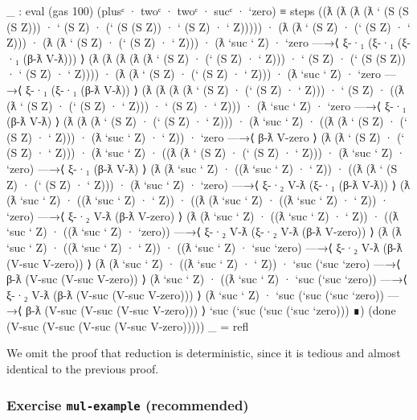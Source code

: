 \begin{fence}
\begin{code}
_ : eval (gas 100) (plusᶜ · twoᶜ · twoᶜ · sucᶜ · `zero) ≡
  steps
   ((ƛ
     (ƛ
      (ƛ (ƛ ` (S (S (S Z))) · ` (S Z) · (` (S (S Z)) · ` (S Z) · ` Z)))))
    · (ƛ (ƛ ` (S Z) · (` (S Z) · ` Z)))
    · (ƛ (ƛ ` (S Z) · (` (S Z) · ` Z)))
    · (ƛ `suc ` Z)
    · `zero
   —→⟨ ξ-·₁ (ξ-·₁ (ξ-·₁ (β-ƛ V-ƛ))) ⟩
    (ƛ
     (ƛ
      (ƛ
       (ƛ (ƛ ` (S Z) · (` (S Z) · ` Z))) · ` (S Z) ·
       (` (S (S Z)) · ` (S Z) · ` Z))))
    · (ƛ (ƛ ` (S Z) · (` (S Z) · ` Z)))
    · (ƛ `suc ` Z)
    · `zero
   —→⟨ ξ-·₁ (ξ-·₁ (β-ƛ V-ƛ)) ⟩
    (ƛ
     (ƛ
      (ƛ (ƛ ` (S Z) · (` (S Z) · ` Z))) · ` (S Z) ·
      ((ƛ (ƛ ` (S Z) · (` (S Z) · ` Z))) · ` (S Z) · ` Z)))
    · (ƛ `suc ` Z)
    · `zero
   —→⟨ ξ-·₁ (β-ƛ V-ƛ) ⟩
    (ƛ
     (ƛ (ƛ ` (S Z) · (` (S Z) · ` Z))) · (ƛ `suc ` Z) ·
     ((ƛ (ƛ ` (S Z) · (` (S Z) · ` Z))) · (ƛ `suc ` Z) · ` Z))
    · `zero
   —→⟨ β-ƛ V-zero ⟩
    (ƛ (ƛ ` (S Z) · (` (S Z) · ` Z))) · (ƛ `suc ` Z) ·
    ((ƛ (ƛ ` (S Z) · (` (S Z) · ` Z))) · (ƛ `suc ` Z) · `zero)
   —→⟨ ξ-·₁ (β-ƛ V-ƛ) ⟩
    (ƛ (ƛ `suc ` Z) · ((ƛ `suc ` Z) · ` Z)) ·
    ((ƛ (ƛ ` (S Z) · (` (S Z) · ` Z))) · (ƛ `suc ` Z) · `zero)
   —→⟨ ξ-·₂ V-ƛ (ξ-·₁ (β-ƛ V-ƛ)) ⟩
    (ƛ (ƛ `suc ` Z) · ((ƛ `suc ` Z) · ` Z)) ·
    ((ƛ (ƛ `suc ` Z) · ((ƛ `suc ` Z) · ` Z)) · `zero)
   —→⟨ ξ-·₂ V-ƛ (β-ƛ V-zero) ⟩
    (ƛ (ƛ `suc ` Z) · ((ƛ `suc ` Z) · ` Z)) ·
    ((ƛ `suc ` Z) · ((ƛ `suc ` Z) · `zero))
   —→⟨ ξ-·₂ V-ƛ (ξ-·₂ V-ƛ (β-ƛ V-zero)) ⟩
    (ƛ (ƛ `suc ` Z) · ((ƛ `suc ` Z) · ` Z)) ·
    ((ƛ `suc ` Z) · `suc `zero)
   —→⟨ ξ-·₂ V-ƛ (β-ƛ (V-suc V-zero)) ⟩
    (ƛ (ƛ `suc ` Z) · ((ƛ `suc ` Z) · ` Z)) · `suc (`suc `zero)
   —→⟨ β-ƛ (V-suc (V-suc V-zero)) ⟩
    (ƛ `suc ` Z) · ((ƛ `suc ` Z) · `suc (`suc `zero))
   —→⟨ ξ-·₂ V-ƛ (β-ƛ (V-suc (V-suc V-zero))) ⟩
    (ƛ `suc ` Z) · `suc (`suc (`suc `zero))
   —→⟨ β-ƛ (V-suc (V-suc (V-suc V-zero))) ⟩
    `suc (`suc (`suc (`suc `zero)))
   ∎)
   (done (V-suc (V-suc (V-suc (V-suc V-zero)))))
_ = refl
\end{code}
\end{fence}

We omit the proof that reduction is deterministic, since it is tedious
and almost identical to the previous proof.

\hypertarget{exercise-mul-example-recommended}{%
\subsubsection{\texorpdfstring{Exercise \texttt{mul-example}
(recommended)}{Exercise mul-example (recommended)}}\label{exercise-mul-example-recommended}}

